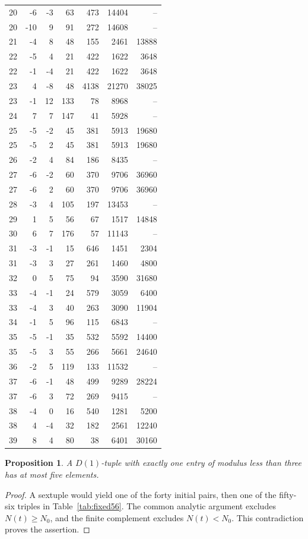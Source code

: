 \documentclass[12pt]{article}
\newtheorem{proposition}[theorem]{Proposition}
\numberwithin{equation}{section}
\begin{document}
\begin{longtable}{r|r r|r|r|r|r}
20 & -6 & -3 & 63 & 473 & 14404 & -- \\
20 & -10 & 9 & 91 & 272 & 14608 & -- \\
21 & -4 & 8 & 48 & 155 & 2461 & 13888 \\
22 & -5 & 4 & 21 & 422 & 1622 & 3648 \\
22 & -1 & -4 & 21 & 422 & 1622 & 3648 \\
23 & 4 & -8 & 48 & 4138 & 21270 & 38025 \\
23 & -1 & 12 & 133 & 78 & 8968 & -- \\
24 & 7 & 7 & 147 & 41 & 5928 & -- \\
25 & -5 & -2 & 45 & 381 & 5913 & 19680 \\
25 & -5 & 2 & 45 & 381 & 5913 & 19680 \\
26 & -2 & 4 & 84 & 186 & 8435 & -- \\
27 & -6 & -2 & 60 & 370 & 9706 & 36960 \\
27 & -6 & 2 & 60 & 370 & 9706 & 36960 \\
28 & -3 & 4 & 105 & 197 & 13453 & -- \\
29 & 1 & 5 & 56 & 67 & 1517 & 14848 \\
30 & 6 & 7 & 176 & 57 & 11143 & -- \\
31 & -3 & -1 & 15 & 646 & 1451 & 2304 \\
31 & -3 & 3 & 27 & 261 & 1460 & 4800 \\
32 & 0 & 5 & 75 & 94 & 3590 & 31680 \\
33 & -4 & -1 & 24 & 579 & 3059 & 6400 \\
33 & -4 & 3 & 40 & 263 & 3090 & 11904 \\
34 & -1 & 5 & 96 & 115 & 6843 & -- \\
35 & -5 & -1 & 35 & 532 & 5592 & 14400 \\
35 & -5 & 3 & 55 & 266 & 5661 & 24640 \\
36 & -2 & 5 & 119 & 133 & 11532 & -- \\
37 & -6 & -1 & 48 & 499 & 9289 & 28224 \\
37 & -6 & 3 & 72 & 269 & 9415 & -- \\
38 & -4 & 0 & 16 & 540 & 1281 & 5200 \\
38 & 4 & -4 & 32 & 182 & 2561 & 12240 \\
39 & 8 & 4 & 80 & 38 & 6401 & 30160 \\
\end{longtable}
\begin{proposition}\label{prop:one-small}
A $D(1)$-tuple with exactly one entry of modulus less than three has
at most five elements.
\end{proposition}
\begin{proof}
A sextuple would yield one of the forty initial pairs, then one of the
fifty-six triples in Table~\ref{tab:fixed56}. The common analytic
argument excludes $N(t)\ge N_0$, and the finite complement excludes
$N(t)<N_0$. This contradiction proves the assertion.
\end{proof}
\end{document}
